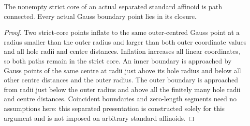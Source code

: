\begin{lemma}\label{lem:fc-separated-core-connected-boundary}
\leanok
{}
The nonempty strict core of an actual separated standard affinoid is
path connected. Every actual Gauss boundary point lies in its closure.
\end{lemma}

\begin{proof}
Two strict-core points inflate to the same outer-centred Gauss point at a
radius smaller than the outer radius and larger than both outer coordinate
values and all hole radii and centre distances. Inflation increases all
linear coordinates, so both paths remain in the strict core.
An inner boundary is approached by Gauss points of the same centre at
radii just above its hole radius and below all other centre distances and
the outer radius. The outer boundary is approached from radii just below
the outer radius and above all the finitely many hole radii and centre
distances. Coincident boundaries and zero-length segments need no
assumptions here: this separated presentation is constructed solely for
this argument and is not imposed on arbitrary standard affinoids.
\end{proof}
